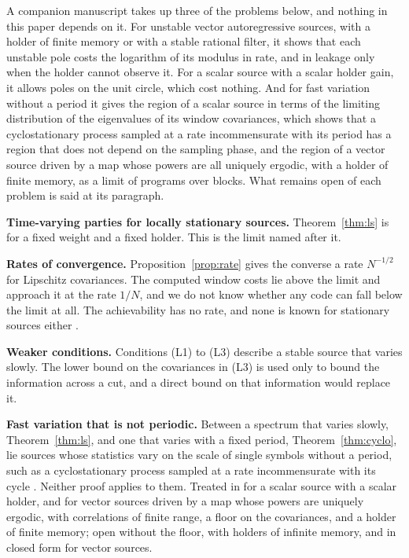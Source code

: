 \documentclass[11pt,onecolumn]{IEEEtran}
\begin{document}
A companion manuscript \cite{part4} takes up three of the problems
below, and nothing in this paper depends on it. For unstable vector
autoregressive sources, with a holder of finite memory or with a stable
rational filter, it shows that each unstable pole costs the logarithm
of its modulus in rate, and in leakage only when the holder cannot
observe it. For a scalar source with a scalar holder gain, it allows
poles on the unit circle, which cost nothing. And for fast variation
without a period it gives the region of a scalar source in terms of the
limiting distribution of the eigenvalues of its window covariances,
which shows that a cyclostationary process sampled at a rate
incommensurate with its period has a region that does not depend on the
sampling phase, and the region of a vector source driven by a map whose
powers are all uniquely ergodic, with a holder of finite memory, as a
limit of programs over blocks. What remains open of each problem is
said at its paragraph.

\textbf{Time-varying parties for locally stationary sources.}
Theorem~\ref{thm:ls} is for a fixed weight and a fixed holder. This is
the limit named after it.

\textbf{Rates of convergence.} Proposition~\ref{prop:rate} gives the
converse a rate $N^{-1/2}$ for Lipschitz covariances. The computed
window costs lie above the limit and approach it at the rate $1/N$,
and we do not know whether any code can fall below the limit at all. The achievability has no rate, and none is known for
stationary sources either \cite{part2}.

\textbf{Weaker conditions.} Conditions (L1) to (L3) describe a stable
source that varies slowly. The lower bound on the covariances in (L3)
is used only to bound the information across a cut, and a direct
bound on that information would replace it.

\textbf{Fast variation that is not periodic.} Between a spectrum that
varies slowly, Theorem~\ref{thm:ls}, and one that varies with a fixed
period, Theorem~\ref{thm:cyclo}, lie sources whose statistics vary on
the scale of single symbols without a period, such as a
cyclostationary process sampled at a rate incommensurate with its
cycle \cite{abakasanga2020}. Neither proof applies to them. Treated in
\cite{part4} for a scalar source with a scalar holder, and for vector
sources driven by a map whose powers are uniquely ergodic, with
correlations of finite range, a floor on the covariances, and a holder
of finite memory; open without the floor, with holders of infinite
memory, and in closed form for vector sources.
\end{document}
